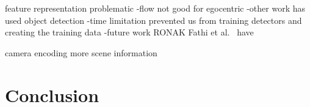 \documentclass[10pt,twocolumn,letterpaper]{article}
\begin{document}
feature representation problematic
-flow not good for egocentric
-other work has used object detection
	-time limitation prevented us from training detectors and creating the training data
	-future work
RONAK
 Fathi et al.~\cite{fathi2011understanding} have 
 
 camera encoding more scene information
 
\section{Conclusion}



{\small


}
\end{document}
